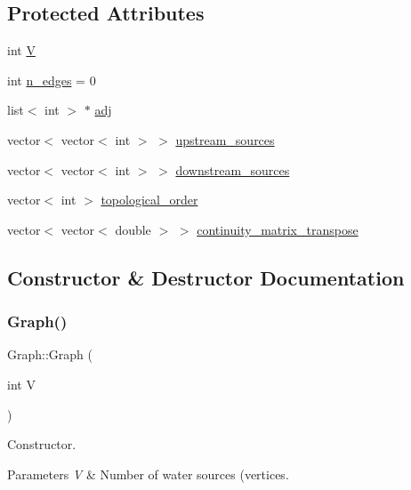 \subsection*{Protected Attributes}
\begin{DoxyCompactItemize}
\item 
int \mbox{\hyperlink{classGraph_a2b722f7cfa7a21e4cb5fae488b3d4dcc}{V}}
\item 
int \mbox{\hyperlink{classGraph_a9a7e34b482b020fa136fc8e0fa2d0030}{n\+\_\+edges}} = 0
\item 
list$<$ int $>$ $\ast$ \mbox{\hyperlink{classGraph_a04ab9c17ad31aa036def8db0f88b035b}{adj}}
\item 
vector$<$ vector$<$ int $>$ $>$ \mbox{\hyperlink{classGraph_a2b9dc8c44ac87d67b061af1bf8dab2fa}{upstream\+\_\+sources}}
\item 
vector$<$ vector$<$ int $>$ $>$ \mbox{\hyperlink{classGraph_a1c89a48555f165ef3e80b85ca5655bea}{downstream\+\_\+sources}}
\item 
vector$<$ int $>$ \mbox{\hyperlink{classGraph_ad18af6207537a43b3cf53b56acaf92fd}{topological\+\_\+order}}
\item 
vector$<$ vector$<$ double $>$ $>$ \mbox{\hyperlink{classGraph_af903899bcb412f62ec4aa295eef9f45c}{continuity\+\_\+matrix\+\_\+transpose}}
\end{DoxyCompactItemize}


\subsection{Constructor \& Destructor Documentation}
\mbox{\label{classGraph_af3ff6b295df8bf3bee0bafd7c7d56915}} 
\subsubsection{\texorpdfstring{Graph()}{Graph()}\hspace{0.1cm}{\footnotesize\ttfamily [1/2]}}
{\footnotesize\ttfamily Graph\+::\+Graph (\begin{DoxyParamCaption}\item[{int}]{V }\end{DoxyParamCaption})}

Constructor. 
\begin{DoxyParams}{Parameters}
{\em V} & Number of water sources (vertices. \\
\hline
\end{DoxyParams}
\mbox{\label{classGraph_ae4c72b8ac4d693c49800a4c7e273654f}} 
